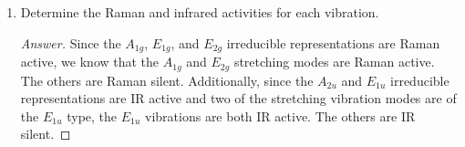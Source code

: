 \documentclass[../psets.tex]{subfiles}
\begin{document}
\begin{enumerate}[label={\Roman*)}]
\begin{enumerate}[label={\alph*)}]
\begin{proof}[Answer]
        \end{proof}
        \item Determine the Raman and infrared activities for each vibration.
        \begin{proof}[Answer]
            Since the $A_{1g}$, $E_{1g}$, and $E_{2g}$ irreducible representations are Raman active, we know that the $A_{1g}$ and $E_{2g}$  stretching modes are Raman active. The others are Raman silent. Additionally, since the $A_{2u}$ and $E_{1u}$ irreducible representations are IR active and two of the  stretching vibration modes are of the $E_{1u}$ type, the $E_{1u}$ vibrations are both IR active. The others are IR silent.
        \end{proof}
    \end{enumerate}
\end{enumerate}
\end{document}
